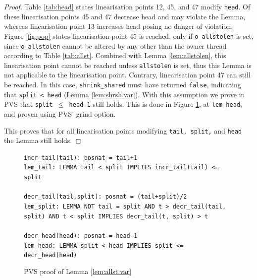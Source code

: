 \documentclass{sig-alternate-br}
\begin{document}
\begin{proof}
	Table \ref{tab:head} states linearisation points 12, 45, and 47 modify \texttt{head}.
	Of these linearisation points 45 and 47 decrease head and may violate the Lemma, whereas linearisation point 13 increases head posing no danger of violation.
	Figure \ref{fig:pop} states linearisation point 45 is reached, only if \texttt{o\_allstolen} is set, since \texttt{o\_allstolen} cannot be altered by any other than the owner thread according to Table \ref{tab:allst}.
	Combined with Lemma \ref{lem:allstolen}, this linearisation point cannot be reached unless \texttt{allstolen} is set, thus this Lemma is not applicable to the linearisation point.
	Contrary, linearisation point 47 can still be reached.
	In this case, \texttt{shrink\_shared} must have returned \texttt{false}, indicating that \texttt{split < head} (Lemma \ref{lem:shrsh.var}).
	With this assumption we prove in PVS that \texttt{split $\leq$ head-1} still holds.
	This is done in Figure \ref{pvs:allst.var}, at \texttt{lem\_head}, and proven using PVS' grind option.
	
	This proves that for all linearisation points modifying \texttt{tail, split,} and \texttt{head} the Lemma still holds.
\end{proof}
\begin{figure}[h]
	\texttt{incr\_tail(tail): posnat = tail+1}\\
	\texttt{lem\_tail: LEMMA tail < split IMPLIES incr\_tail(tail) <= split}\\\\	
	\texttt{decr\_tail(tail,split): posnat = (tail+split)/2}\\
	\texttt{lem\_split: LEMMA NOT tail = split AND t > decr\_tail(tail, split) AND t < split IMPLIES decr\_tail(t, split) > t}\\\\
	\texttt{decr\_head(head): posnat = head-1}\\
	\texttt{lem\_head: LEMMA split < head IMPLIES split <= decr\_head(head)}
	\caption{PVS proof of Lemma \ref{lem:allst.var}}
	\label{pvs:allst.var}
\end{figure}
\end{document}

